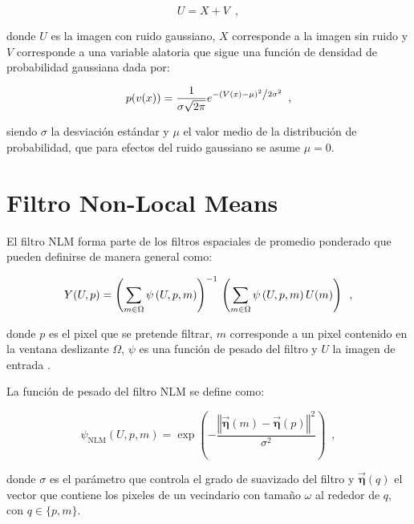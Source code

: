 \begin{equation}
\label{eq:modelruido}
U = X + V \enspace ,
\end{equation}

 donde $U$ es la imagen con ruido gaussiano, $X$ corresponde a la imagen sin ruido y $V$ corresponde a una variable alatoria que sigue una funci\'on de densidad de probabilidad gaussiana dada por: 
 
\begin{equation}
\label{eq:probfuncgauus}
p(v(x)) = \frac{1}{{\sigma \sqrt {2\pi } }}e^{{{ - \left( {V(x) - \mu } \right)^2 } \mathord{\left/ {\vphantom {{ - \left( {x - \mu } \right)^2 } {2\sigma ^2 }}} \right. \kern-\nulldelimiterspace} {2\sigma ^2 }}} \enspace ,
\end{equation}

siendo $\sigma$ la desviaci\'on est\'andar  y $\mu$ el valor medio de la distribuci\'on de probabilidad, que para efectos del ruido gaussiano se asume $\mu = 0$.


\section{Filtro Non-Local Means}
\label{ch:marco_nlm}

El filtro NLM forma parte de los filtros espaciales de promedio ponderado que pueden definirse de manera general como:

\begin{equation}
\label{eq:weighted}
Y(U,p)=\left(\sum_{m\in \Omega}\psi\left(U, p, m\right)\right)^{-1} \\ \left(\sum_{m\in \Omega}\psi\left(U, p, m\right)U(m)\right) \enspace ,
\end{equation}

donde $p$ es el pixel que se pretende filtrar, $m$ corresponde a un pixel contenido en la ventana deslizante $\Omega$, $\psi$ es una funci\'on de pesado del filtro y $U$ la imagen de entrada \cite{calderon2015dewaff}.

La funci\'on de pesado del filtro NLM se define como:

\begin{equation}
\label{eq:nlmfunc}
\psi_{\textrm{NLM}}\left(U,p,m\right) = \exp\left(-\frac{\left\Vert \vec{\boldsymbol{\eta}}\left(m\right)-\vec{\boldsymbol{\eta}}\left(p\right)\right\Vert^2 }{\sigma^{2}}\right) \enspace ,
\end{equation}

donde $\sigma$ es el par\'ametro que controla el grado de suavizado del filtro y $\vec{\boldsymbol{\eta}}\left(q\right)$ el vector que contiene los pixeles de un vecindario con tama\~no $\omega$ al rededor de $q$, con $q \in \{p,m\}$.

